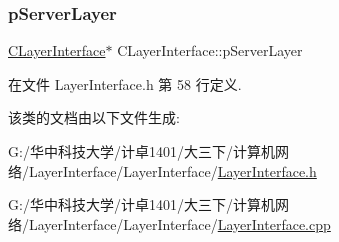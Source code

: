 \subsubsection{\texorpdfstring{p\+Server\+Layer}{pServerLayer}}
{\footnotesize\ttfamily \hyperlink{class_c_layer_interface}{C\+Layer\+Interface}$\ast$ C\+Layer\+Interface\+::p\+Server\+Layer\hspace{0.3cm}{\ttfamily [protected]}}



在文件 Layer\+Interface.\+h 第 58 行定义.



该类的文档由以下文件生成\+:\begin{DoxyCompactItemize}
\item 
G\+:/华中科技大学/计卓1401/大三下/计算机网络/\+Layer\+Interface/\+Layer\+Interface/\hyperlink{_layer_interface_8h}{Layer\+Interface.\+h}\item 
G\+:/华中科技大学/计卓1401/大三下/计算机网络/\+Layer\+Interface/\+Layer\+Interface/\hyperlink{_layer_interface_8cpp}{Layer\+Interface.\+cpp}\end{DoxyCompactItemize}
